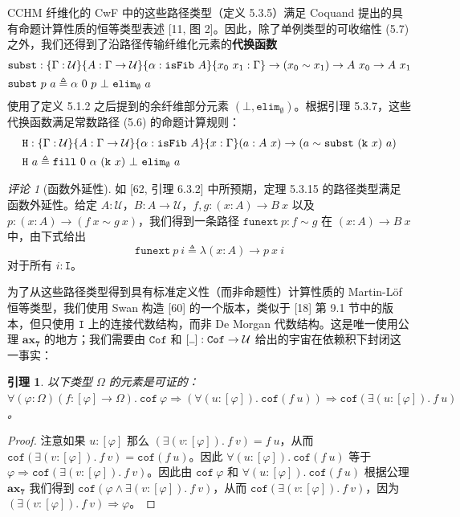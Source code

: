 \documentclass{ctexrep}
\theoremstyle{plain}
\newtheorem{lemma}[theorem]{引理}
\theoremstyle{definition}
\theoremstyle{remark}
\newtheorem{remark}[theorem]{评论}
\newcommand{\ax}[1]{\mathbf{ax_{#1}}}
\newcommand{\ul}{{\rule[0ex]{0.5em}{0.4pt}}} %
\begin{document}
CCHM 纤维化的 CwF 中的这些路径类型（定义 5.3.5）满足 Coquand 提出的具有命题计算性质的恒等类型表述 [11, 图 2]。因此，除了单例类型的可收缩性 (5.7) 之外，我们还得到了沿路径传输纤维化元素的\textbf{代换函数}
\begin{align}
&\mathtt{subst} : \{\Gamma : \mathcal{U}\}\{A : \Gamma \to \mathcal{U}\}\{\alpha : \mathtt{isFib}\ A\}\{x_0\ x_1 : \Gamma\} \to (x_0 \sim x_1) \to A\ x_0 \to A\ x_1 \\
&\mathtt{subst}\ p\ a \triangleq \alpha\ 0\ p\ \bot\ \mathtt{elim}_{\emptyset}\ a \notag
\end{align}
使用了定义 5.1.2 之后提到的余纤维部分元素 $(\bot, \mathtt{elim}_{\emptyset})$。根据引理 5.3.7，这些代换函数满足常数路径 (5.6) 的命题计算规则：
\begin{align}
&\mathtt{H} : \{\Gamma : \mathcal{U}\}\{A : \Gamma \to \mathcal{U}\}\{\alpha : \mathtt{isFib}\ A\}\{x : \Gamma\}(a : A\ x) \to (a \sim \mathtt{subst}\ (\mathtt{k}\ x)\ a) \\
&\mathtt{H}\ a \triangleq \mathtt{fill}\ 0\ \alpha\ (\mathtt{k}\ x)\ \bot\ \mathtt{elim}_{\emptyset}\ a \notag
\end{align}

\begin{remark}[函数外延性]
如 [62, 引理 6.3.2] 中所预期，定理 5.3.15 的路径类型满足函数外延性。给定 $A : \mathcal{U}$，$B : A \to \mathcal{U}$，$f, g : (x : A) \to B\ x$ 以及 $p : (x : A) \to (f\ x \sim g\ x)$，我们得到一条路径 $\mathtt{funext}\ p : f \sim g$ 在 $(x : A) \to B\ x$ 中，由下式给出
\[
\mathtt{funext}\ p\ i \triangleq \lambda(x : A) \to p\ x\ i
\]
对于所有 $i : \mathtt{I}$。
\end{remark}

为了从这些路径类型得到具有标准定义性（而非命题性）计算性质的 Martin-Löf 恒等类型，我们使用 Swan 构造 [60] 的一个版本，类似于 [18] 第 9.1 节中的版本，但只使用 $\mathtt{I}$ 上的连接代数结构，而非 De Morgan 代数结构。这是唯一使用公理 $\ax{7}$ 的地方；我们需要由 $\mathtt{Cof}$ 和 $[\ul ] : \mathtt{Cof} \to \mathcal{U}$ 给出的宇宙在依赖积下封闭这一事实：

\begin{lemma}
以下类型 $\Omega$ 的元素是可证的：$\forall(\varphi : \Omega)(f : [\varphi] \to \Omega).\ \mathtt{cof}\ \varphi \Rightarrow (\forall(u : [\varphi]).\ \mathtt{cof}(f\ u)) \Rightarrow \mathtt{cof}(\exists(u : [\varphi]).\ f\ u)$。
\end{lemma}

\begin{proof}
注意如果 $u : [\varphi]$ 那么 $(\exists(v : [\varphi]).\ f\ v) = f\ u$，从而 $\mathtt{cof}(\exists(v : [\varphi]).\ f\ v) = \mathtt{cof}(f\ u)$。因此 $\forall(u : [\varphi]).\ \mathtt{cof}(f\ u)$ 等于 $\varphi \Rightarrow \mathtt{cof}(\exists(v : [\varphi]).\ f\ v)$。因此由 $\mathtt{cof}\ \varphi$ 和 $\forall(u : [\varphi]).\ \mathtt{cof}(f\ u)$ 根据公理 $\ax{7}$ 我们得到 $\mathtt{cof}(\varphi \land \exists(v : [\varphi]).\ f\ v)$，从而 $\mathtt{cof}(\exists(v : [\varphi]).\ f\ v)$，因为 $(\exists(v : [\varphi]).\ f\ v) \Rightarrow \varphi$。
\end{proof}
\end{document}
